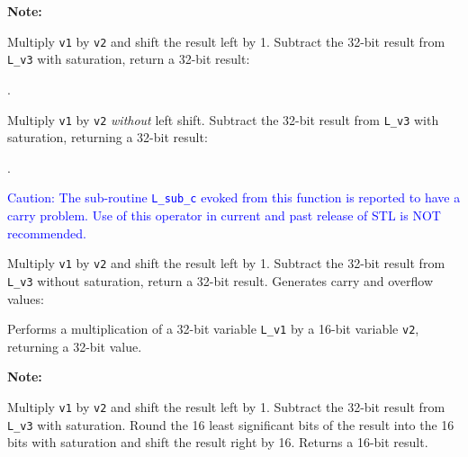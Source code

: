 
\textbf{Note:} \hfill {}


Multiply {\tt v1} by {\tt v2} and shift the result left by 1. Subtract
the 32-bit result from {\tt L\_v3} with saturation, return a 32-bit
result:

.


Multiply {\tt v1} by {\tt v2} {\em without} left shift. Subtract the
32-bit result from {\tt L\_v3} with saturation, returning a 32-bit
result:

.


\textcolor{blue}{
%
Caution: The sub-routine {\tt L\_sub\_c} evoked from this function
is reported to have a carry problem. Use of this operator in current
and past release of STL is NOT recommended.
%
}

Multiply {\tt v1} by {\tt v2} and shift the result left by 1. Subtract
the 32-bit result from {\tt L\_v3} without saturation, return a 32-bit
result. Generates carry and overflow values:




Performs a multiplication of a 32-bit variable {\tt L\_v1} by a 16-bit variable {\tt v2}, returning a 32-bit value.

\textbf{Note:} \hfill {}


Multiply {\tt v1} by {\tt v2} and shift the result left by 1.
Subtract the 32-bit result from {\tt L\_v3} with saturation. Round
the 16 least significant bits of the result into the 16 bits with
saturation and shift the result right by 16. Returns a 16-bit
result.


